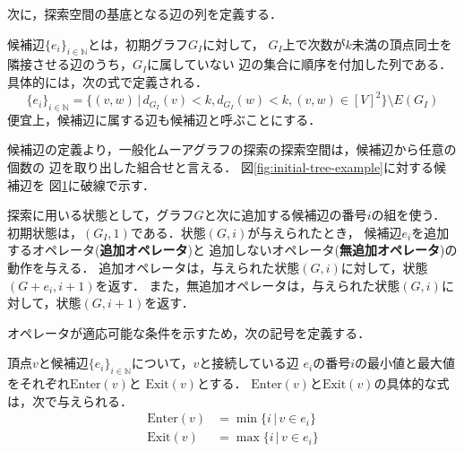 次に，探索空間の基底となる辺の列を定義する．
\begin{definition}
  \label{def:candidate-edges}
  候補辺$\{e_i\}_{i\in\mathbb{N}}$とは，初期グラフ$G_I$に対して，
  $G_I$上で次数が$k$未満の頂点同士を隣接させる辺のうち，$G_I$に属していない
  辺の集合に順序を付加した列である．具体的には，次の式で定義される．
  \begin{equation}
    \{e_i\}_{i\in\mathbb{N}} =
    \{(v,w)\,|\,d_{G_I}(v)<k,d_{G_I}(w)<k,(v,w)\in[V]^2\}\setminus E(G_I)
  \end{equation}
  便宜上，候補辺に属する辺も候補辺と呼ぶことにする．
\end{definition}
候補辺の定義より，一般化ムーアグラフの探索の探索空間は，候補辺から任意の個数の
辺を取り出した組合せと言える．
図\ref{fig:initial-tree-example}に対する候補辺を
図\ref{fig:feasible-edges-example}に破線で示す．

\begin{figure}
  \centering
  \begin{minipage}{.35\columnwidth}
    \def\svgwidth{\textwidth}
    
    \label{fig:initial-tree-example}
  \end{minipage}
  \hspace{9em}
  \begin{minipage}{.35\columnwidth}
    \def\svgwidth{\textwidth}
    
    \label{fig:feasible-edges-example}
  \end{minipage}
\end{figure}

探索に用いる状態として，グラフ$G$と次に追加する候補辺の番号$i$の組を使う．
初期状態は，$(G_I,1)$である．状態$(G,i)$が与えられたとき，
候補辺$e_i$を追加するオペレータ(\textbf{追加オペレータ})と
追加しないオペレータ(\textbf{無追加オペレータ})の動作を与える．
追加オペレータは，与えられた状態$(G,i)$に対して，状態$(G+e_i,i+1)$を返す．
また，無追加オペレータは，与えられた状態$(G,i)$に対して，状態$(G,i+1)$を返す．

オペレータが適応可能な条件を示すため，次の記号を定義する．
\begin{definition}
  頂点$v$と候補辺$\{e_i\}_{i\in\mathbb{N}}$について，$v$と接続している辺
  $e_i$の番号$i$の最小値と最大値をそれぞれ$\text{Enter}(v)$と
  $\text{Exit}(v)$とする．
  $\text{Enter}(v)$と$\text{Exit}(v)$の具体的な式は，次で与えられる．
  \begin{equation}
    \label{eq:frontier}
    \begin{aligned}
    \text{Enter}(v) &= \min\{i\,|\,v\in e_i\} \\
    \text{Exit}(v) &= \max\{i\,|\,v\in e_i\}
    \end{aligned}
  \end{equation}
\end{definition}

